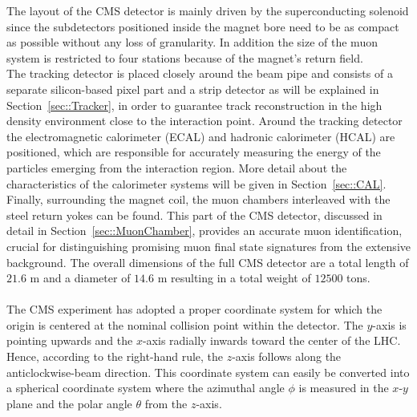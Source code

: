 The layout of the CMS detector is mainly driven by the superconducting solenoid since the subdetectors positioned inside the magnet bore need to be as compact as possible without any loss of granularity. In addition the size of the muon system is restricted to four stations because of the magnet's return field.
\\
The tracking detector is placed closely around the beam pipe and consists of a separate silicon-based pixel part and a strip detector as will be explained in Section~\ref{sec::Tracker}, in order to guarantee track reconstruction in the high density environment close to the interaction point.
Around the tracking detector the electromagnetic calorimeter (ECAL) and hadronic calorimeter (HCAL) are positioned, which are responsible for accurately measuring the energy of the particles emerging from the interaction region. More detail about the characteristics of the calorimeter systems will be given in Section~\ref{sec::CAL}. Finally, surrounding the magnet coil, the muon chambers interleaved with the steel return yokes can be found. This part of the CMS detector, discussed in detail in Section~\ref{sec::MuonChamber}, provides an accurate muon identification, crucial for distinguishing promising muon final state signatures from the extensive background. 
The overall dimensions of the full CMS detector are a total length of $21.6$ m and a diameter of $14.6$ m resulting in a total weight of $12500$ tons.
\\
\\
The CMS experiment has adopted a proper coordinate system for which the origin is centered at the nominal collision point within the detector. The $y$-axis is pointing upwards and the $x$-axis radially inwards toward the center of the LHC. Hence, according to the right-hand rule, the $z$-axis follows along the anticlockwise-beam direction. This coordinate system can easily be converted into a spherical coordinate system where the azimuthal angle $\phi$ is measured in the $x$-$y$ plane and the polar angle $\theta$ from the $z$-axis. 
